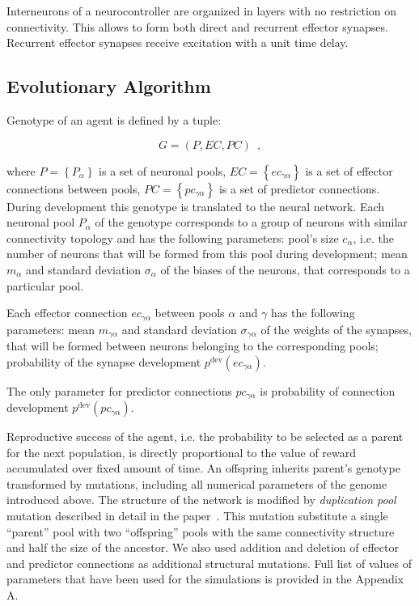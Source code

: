 \documentclass[letterpaper]{article}
\begin{document}

Interneurons of a neurocontroller are organized in layers with no restriction on connectivity. This allows to form both direct and recurrent effector synapses. Recurrent effector synapses receive excitation with a unit time delay.

\subsection{Evolutionary Algorithm}

Genotype of an agent is defined by a tuple:

\begin{equation}
	G = \left( P, EC, PC\right)\enspace, 
\end{equation} 

\noindent where 
$P = \left\{P_{\alpha}\right\}$ is a set of neuronal pools, 
$EC = \left\{ec_{\gamma\alpha}\right\}$ is a set of effector connections between pools, 
$PC = \left\{pc_{\gamma\alpha}\right\}$ is a set of predictor connections. 
During development this genotype is translated to the neural network. Each neuronal pool $P_{\alpha}$ of the genotype corresponds to a group of neurons with similar connectivity topology and has the following parameters: pool's size $c_{\alpha}$, i.e. the number of neurons that will be formed from this pool during development; mean $m_{\alpha}$ and standard deviation $\sigma_{\alpha}$ of the biases of the neurons, that corresponds to a particular pool.

Each effector connection $ec_{\gamma\alpha}$ between pools $\alpha$ and $\gamma$ has the following parameters: mean $m_{\gamma\alpha}$ and standard deviation $\sigma_{\gamma\alpha}$ of the weights of the synapses, that will be formed between neurons belonging to the corresponding pools; probability of the synapse development $p^{\mathrm{dev}}\left(ec_{\gamma\alpha}\right)$.

The only parameter for predictor connections $pc_{\gamma\alpha}$ is probability of connection development $p^{\mathrm{dev}}\left(pc_{\gamma\alpha}\right)$.

Reproductive success of the agent, i.e. the probability to be selected as a parent for the next population, is directly proportional to the value of reward accumulated over fixed amount of time. An offspring inherits parent's genotype transformed by mutations, including all numerical parameters of the genome introduced above. The structure of the network is modified by {\em duplication pool} mutation described in detail in the paper~\citep{LakhmanBurtsev2013}. This mutation substitute a single ``parent'' pool with two ``offspring'' pools with the same connectivity structure and half the size of the ancestor. We also used addition and deletion of effector and predictor connections as additional structural mutations. Full list of values of parameters that have been used for the simulations is provided in the Appendix A.
\end{document}

